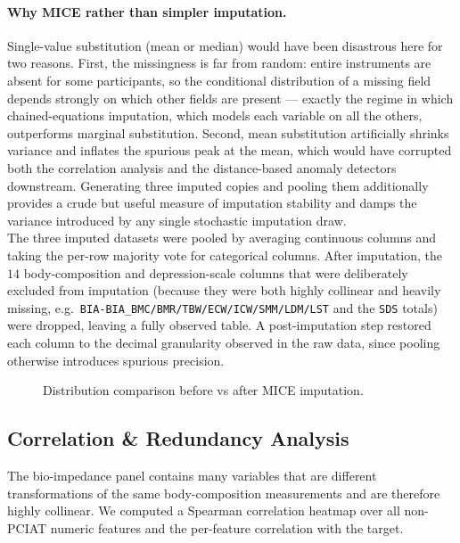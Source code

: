 \paragraph{Why MICE rather than simpler imputation.} Single-value substitution (mean or median) would have been disastrous here for two reasons. First, the missingness is far from random: entire instruments are absent for some participants, so the conditional distribution of a missing field depends strongly on which other fields are present --- exactly the regime in which chained-equations imputation, which models each variable on all the others, outperforms marginal substitution. Second, mean substitution artificially shrinks variance and inflates the spurious peak at the mean, which would have corrupted both the correlation analysis and the distance-based anomaly detectors downstream. Generating three imputed copies and pooling them additionally provides a crude but useful measure of imputation stability and damps the variance introduced by any single stochastic imputation draw.\\

The three imputed datasets were pooled by averaging continuous columns and taking the per-row majority vote for categorical columns. After imputation, the $14$ body-composition and depression-scale columns that were deliberately excluded from imputation (because they were both highly collinear and heavily missing, e.g.\ \texttt{BIA-BIA\_BMC/BMR/TBW/ECW/ICW/SMM/LDM/LST} and the \texttt{SDS} totals) were dropped, leaving a fully observed table. A post-imputation step restored each column to the decimal granularity observed in the raw data, since pooling otherwise introduces spurious precision.

\begin{figure}[h]
    \centering
    \caption{Distribution comparison before vs after MICE imputation.}
    \label{fig:cmi_mice}
\end{figure}

\subsection{Correlation \& Redundancy Analysis}
The bio-impedance panel contains many variables that are different transformations of the same body-composition measurements and are therefore highly collinear. We computed a Spearman correlation heatmap over all non-PCIAT numeric features and the per-feature correlation with the target.\\

